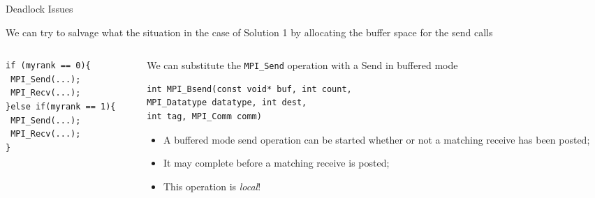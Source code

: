 \documentclass[xcolor={svgnames,usenames}]{beamer}
\begin{document}
\begin{frame}[fragile]{Deadlock Issues}

We can try to salvage what the situation in the case of Solution 1 by allocating the buffer space for the send calls
\vfill
\begin{columns}
\begin{column}{0.3\columnwidth}
{\footnotesize
\begin{verbatim}
if (myrank == 0){
 MPI_Send(...);
 MPI_Recv(...);
}else if(myrank == 1){
 MPI_Send(...); 
 MPI_Recv(...);
}
\end{verbatim}
}
\end{column}
\begin{column}{0.7\columnwidth}
\noindent We can substitute the \texttt{MPI_Send} operation with a Send in buffered mode
{\footnotesize
\begin{verbatim}
int MPI_Bsend(const void* buf, int count, 
MPI_Datatype datatype, int dest,
int tag, MPI_Comm comm)
\end{verbatim}
}
\begin{itemize}
\item A buffered mode send operation can be started whether or not a matching receive
has been posted;
\item It may complete before a matching receive is posted;
\item This operation is \emph{local}!
\end{itemize}
\end{column}
\end{columns}

\end{frame}
\end{document}
